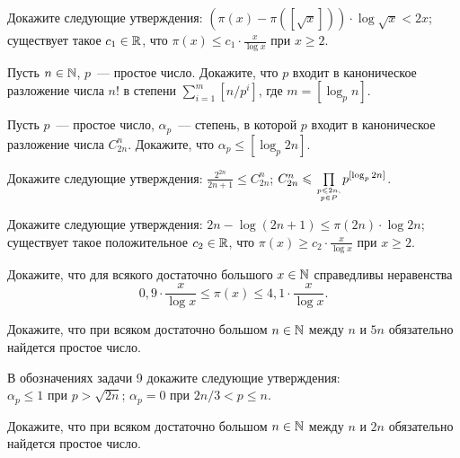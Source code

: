 \documentclass[a4paper,12pt]{article}
\begin{document}
 Докажите следующие утверждения:  
$(\pi(x) - \pi([\sqrt x])) \cdot \log\sqrt x < 2x$; 
существует такое $c_1\in\R$, что $\displaystyle{\pi(x) \leq
c_1\cdot\frac{x}{\log x}}$ при $x \geq 2$. 

 Пусть $n\in\N$, $p$~--- простое число. Докажите, что $p$
входит в каноническое разложение числа  $n!$ в степени
$\sum\limits_{i = 1}^{m}[n/p^i]$, где $m = [\log_p n]$. 

 Пусть $p$~--- простое число, $\alpha_p$~--- степень, в
которой $p$ входит в каноническое разложение числа  $C^n_{2n}$.
Докажите, что $\alpha_p \leq [\log_p 2n]$. 

 Докажите следующие утверждения:  
$\displaystyle{\frac{2^{2n}}{2n + 1} \leq C_{2n}^{n}}$; 
$C_{2n}^{n} \leq \prod\limits_{p \leq 2n,\atop p\in P}\!p^{[\log_p
2n]}$. 

 Докажите следующие утверждения:   $2n -
\log(2n + 1) \leq \pi(2n) \cdot \log 2n$;  существует такое
положительное $c_2\in\R$, что $\displaystyle{\pi(x) \geq c_2 \cdot
\frac{x}{\log x}}$ при $x \geq 2$. 


 Докажите, что для всякого достаточно большого $x\in\N$
справедливы неравенства
  $$
  0{,}9 \cdot \frac{x}{\log x} \leq \pi(x) \leq 4{,}1 \cdot
  \frac{x}{\log x}.
  $$
\vspace*{-5mm}

 Докажите, что при всяком достаточно большом $n\in\N$ между
$n$ и $5n$ обязательно найдется простое число. 

 В обозначениях задачи 9 докажите следующие утверждения:\\
  $\alpha_p \leq 1$ при $p > \sqrt{2n}$; 
$\alpha_p = 0$ при $2n/3 < p \leq n$. 

 Докажите, что при всяком достаточно
большом $n\in\N$ между $n$ и $2n$ обязательно найдется простое
число. 
\end{document}
